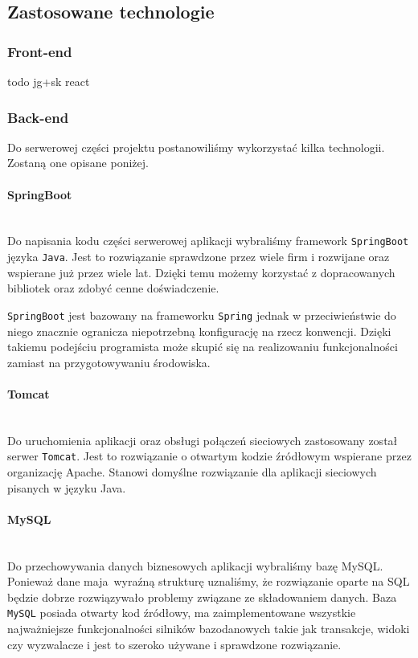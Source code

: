 \documentclass[10pt, titlepage, oneside, a4paper]{article}
\begin{document}
	\subsection{Zastosowane technologie}

	\subsubsection{Front-end}	
	todo jg+sk react
	
	\subsubsection{Back-end}	
	Do serwerowej części projektu postanowiliśmy wykorzystać kilka technologii. Zostaną one opisane poniżej.
	  
	\paragraph{SpringBoot} \mbox{} \\
	Do napisania kodu części serwerowej aplikacji wybraliśmy framework \texttt{SpringBoot} języka \texttt{Java}.
	Jest to rozwiązanie sprawdzone przez wiele firm i rozwijane oraz wspierane już przez wiele lat. Dzięki temu możemy korzystać z dopracowanych bibliotek oraz zdobyć cenne doświadczenie.

	\texttt{SpringBoot} jest bazowany na frameworku \texttt{Spring} jednak w przeciwieństwie do niego znacznie ogranicza niepotrzebną konfigurację na rzecz konwencji.
	Dzięki takiemu podejściu programista może skupić się na realizowaniu funkcjonalności zamiast na przygotowywaniu środowiska.

	\paragraph{Tomcat} \mbox{} \\
	Do uruchomienia aplikacji oraz obsługi połączeń sieciowych zastosowany został serwer \texttt{Tomcat}.
	Jest to rozwiązanie o otwartym kodzie źródłowym wspierane przez organizację Apache.
	Stanowi domyślne rozwiązanie dla aplikacji sieciowych pisanych w języku Java.

	\paragraph{MySQL} \mbox{} \\
	Do przechowywania danych biznesowych aplikacji wybraliśmy bazę MySQL.
	Ponieważ dane maja wyraźną strukturę uznaliśmy, że rozwiązanie oparte na SQL będzie dobrze rozwiązywało problemy związane ze składowaniem danych.
	Baza \texttt{MySQL} posiada otwarty kod źródłowy, ma zaimplementowane wszystkie najważniejsze funkcjonalności silników bazodanowych takie jak transakcje, widoki czy wyzwalacze i jest to szeroko używane i sprawdzone rozwiązanie.
\end{document}
